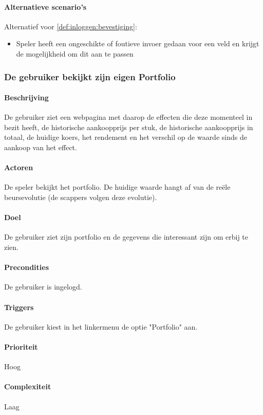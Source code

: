 \paragraph{Alternatieve scenario’s}
Alternatief voor \ref{def:inloggen:bevestiging}:
\begin{itemize}
 \item Speler heeft een ongeschikte of foutieve invoer gedaan voor een veld en krijgt de mogelijkheid om dit aan te passen
\end{itemize}

\subsubsection{De gebruiker bekijkt zijn eigen Portfolio}
\paragraph{Beschrijving} De gebruiker ziet een webpagina met daarop de effecten die deze momenteel in bezit heeft, de historische aankoopprijs per stuk, de historische aankoopprijs in totaal, de huidige koers, het rendement en het verschil op de waarde sinds de aankoop van het effect.
\paragraph{Actoren} De speler bekijkt het portfolio. De huidige waarde hangt af van de reële beursevolutie (de scappers volgen deze evolutie).
\paragraph{Doel} De gebruiker ziet zijn portfolio en de gegevens die interessant zijn om erbij te zien.
\paragraph{Precondities} De gebruiker is ingelogd.
\paragraph{Triggers} De gebruiker kiest in het linkermenu de optie "Portfolio" aan.
\paragraph{Prioriteit}Hoog
\paragraph{Complexiteit}Laag


